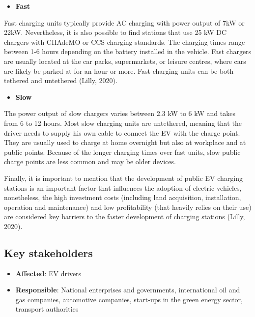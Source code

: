 \documentclass[
]{book}
\providecommand{\tightlist}{%
  \setlength{\itemsep}{0pt}\setlength{\parskip}{0pt}}
\begin{document}
\begin{itemize}
\tightlist
\item
  \textbf{Fast}
\end{itemize}

Fast charging units typically provide AC charging with power output of 7kW or 22kW. Nevertheless, it is also possible to find stations that use 25 kW DC chargers with CHAdeMO or CCS charging standards. The charging times range between 1-6 hours depending on the battery installed in the vehicle. Fast chargers are usually located at the car parks, supermarkets, or leisure centres, where cars are likely be parked at for an hour or more. Fast charging units can be both tethered and untethered (Lilly, 2020).

\begin{itemize}
\tightlist
\item
  \textbf{Slow}
\end{itemize}

The power output of slow chargers varies between 2.3 kW to 6 kW and takes from 6 to 12 hours. Most slow charging units are untethered, meaning that the driver needs to supply his own cable to connect the EV with the charge point. They are usually used to charge at home overnight but also at workplace and at public points. Because of the longer charging times over fast units, slow public charge points are less common and may be older devices.

Finally, it is important to mention that the development of public EV charging stations is an important factor that influences the adoption of electric vehicles, nonetheless, the high investment costs (including land acquisition, installation, operation and maintenance) and low profitability (that heavily relies on their use) are considered key barriers to the faster development of charging stations (Lilly, 2020).

\hypertarget{key-stakeholders-7}{%
\subsection*{Key stakeholders}\label{key-stakeholders-7}}

\begin{itemize}
\tightlist
\item
  \textbf{Affected}: EV drivers
\item
  \textbf{Responsible}: National enterprises and governments, international oil and gas companies, automotive companies, start-ups in the green energy sector, transport authorities
\end{itemize}
\end{document}
